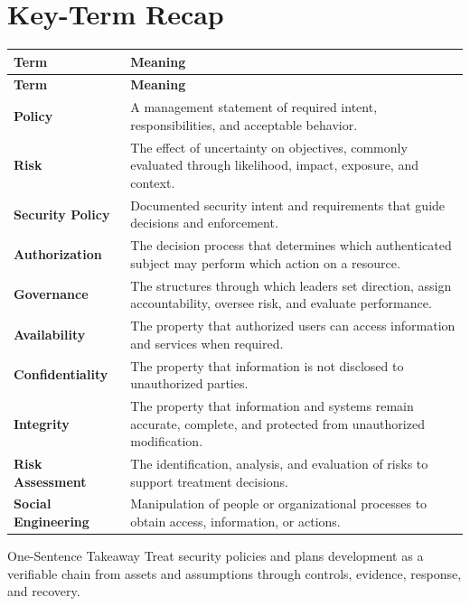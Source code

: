 \documentclass[11pt,letterpaper]{article}
\begin{document}
\section*{Key-Term Recap}
\begin{longtable}{>{\RaggedRight\arraybackslash}p{}>{\RaggedRight\arraybackslash}p{}}
\toprule\rowcolor{Navy}\color{white}\textbf{Term} & \color{white}\textbf{Meaning}\\\midrule
\endfirsthead
\toprule\rowcolor{Navy}\color{white}\textbf{Term} & \color{white}\textbf{Meaning}\\\midrule
\endhead
\textbf{Policy} & A management statement of required intent, responsibilities, and acceptable behavior. \\\midrule
\textbf{Risk} & The effect of uncertainty on objectives, commonly evaluated through likelihood, impact, exposure, and context. \\\midrule
\textbf{Security Policy} & Documented security intent and requirements that guide decisions and enforcement. \\\midrule
\textbf{Authorization} & The decision process that determines which authenticated subject may perform which action on a resource. \\\midrule
\textbf{Governance} & The structures through which leaders set direction, assign accountability, oversee risk, and evaluate performance. \\\midrule
\textbf{Availability} & The property that authorized users can access information and services when required. \\\midrule
\textbf{Confidentiality} & The property that information is not disclosed to unauthorized parties. \\\midrule
\textbf{Integrity} & The property that information and systems remain accurate, complete, and protected from unauthorized modification. \\\midrule
\textbf{Risk Assessment} & The identification, analysis, and evaluation of risks to support treatment decisions. \\\midrule
\textbf{Social Engineering} & Manipulation of people or organizational processes to obtain access, information, or actions. \\\midrule
\bottomrule
\end{longtable}
\begin{CornellExamBox}{One-Sentence Takeaway}
Treat security policies and plans development as a verifiable chain from assets and assumptions through controls, evidence, response, and recovery.
\end{CornellExamBox}
\end{document}

